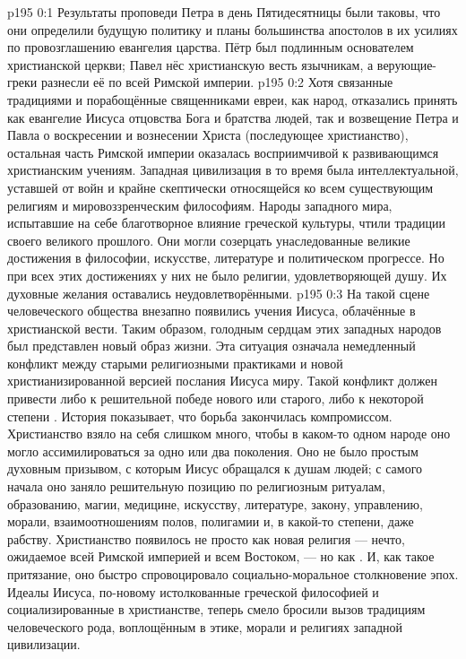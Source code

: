 \author{Промежуточные создания}
\vs p195 0:1 Результаты проповеди Петра в день Пятидесятницы были таковы, что они определили будущую политику и планы большинства апостолов в их усилиях по провозглашению евангелия царства. Пётр был подлинным основателем христианской церкви; Павел нёс христианскую весть язычникам, а верующие\hyp{}греки разнесли её по всей Римской империи.
\vs p195 0:2 Хотя связанные традициями и порабощённые священниками евреи, как народ, отказались принять как евангелие Иисуса отцовства Бога и братства людей, так и возвещение Петра и Павла о воскресении и вознесении Христа (последующее христианство), остальная часть Римской империи оказалась восприимчивой к развивающимся христианским учениям. Западная цивилизация в то время была интеллектуальной, уставшей от войн и крайне скептически относящейся ко всем существующим религиям и мировоззренческим философиям. Народы западного мира, испытавшие на себе благотворное влияние греческой культуры, чтили традиции своего великого прошлого. Они могли созерцать унаследованные великие достижения в философии, искусстве, литературе и политическом прогрессе. Но при всех этих достижениях у них не было религии, удовлетворяющей душу. Их духовные желания оставались неудовлетворёнными.
\vs p195 0:3 На такой сцене человеческого общества внезапно появились учения Иисуса, облачённые в христианской вести. Таким образом, голодным сердцам этих западных народов был представлен новый образ жизни. Эта ситуация означала немедленный конфликт между старыми религиозными практиками и новой христианизированной версией послания Иисуса миру. Такой конфликт должен привести либо к решительной победе нового или старого, либо к некоторой степени . История показывает, что борьба закончилась компромиссом. Христианство взяло на себя слишком много, чтобы в каком\hyp{}то одном народе оно могло ассимилироваться за одно или два поколения. Оно не было простым духовным призывом, с которым Иисус обращался к душам людей; с самого начала оно заняло решительную позицию по религиозным ритуалам, образованию, магии, медицине, искусству, литературе, закону, управлению, морали, взаимоотношениям полов, полигамии и, в какой\hyp{}то степени, даже рабству. Христианство появилось не просто как новая религия --- нечто, ожидаемое всей Римской империей и всем Востоком, --- но как . И, как такое притязание, оно быстро спровоцировало социально\hyp{}моральное столкновение эпох. Идеалы Иисуса, по\hyp{}новому истолкованные греческой философией и социализированные в христианстве, теперь смело бросили вызов традициям человеческого рода, воплощённым в этике, морали и религиях западной цивилизации.
